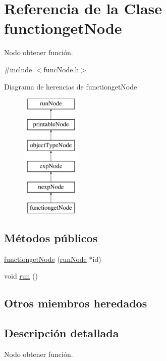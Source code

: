 \hypertarget{classfunctiongetNode}{\section{Referencia de la Clase functionget\-Node}
\label{classfunctiongetNode}
}


Nodo obtener función.  




{\ttfamily \#include $<$func\-Node.\-h$>$}

Diagrama de herencias de functionget\-Node\begin{figure}[H]
\begin{center}
\leavevmode
\includegraphics[height=6.000000cm]{classfunctiongetNode}
\end{center}
\end{figure}
\subsection*{Métodos públicos}
\begin{DoxyCompactItemize}
\item 
\hyperlink{classfunctiongetNode_a0d156c176a9c57b0dd09c632e0a97436}{functionget\-Node} (\hyperlink{classrunNode}{run\-Node} $\ast$id)
\item 
void \hyperlink{classfunctiongetNode_a44cb617849960e62101f2a5681473567}{run} ()
\end{DoxyCompactItemize}
\subsection*{Otros miembros heredados}


\subsection{Descripción detallada}
Nodo obtener función. 

